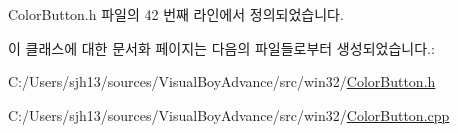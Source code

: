 Color\+Button.\+h 파일의 42 번째 라인에서 정의되었습니다.



이 클래스에 대한 문서화 페이지는 다음의 파일들로부터 생성되었습니다.\+:\begin{DoxyCompactItemize}
\item 
C\+:/\+Users/sjh13/sources/\+Visual\+Boy\+Advance/src/win32/\mbox{\hyperlink{_color_button_8h}{Color\+Button.\+h}}\item 
C\+:/\+Users/sjh13/sources/\+Visual\+Boy\+Advance/src/win32/\mbox{\hyperlink{_color_button_8cpp}{Color\+Button.\+cpp}}\end{DoxyCompactItemize}
